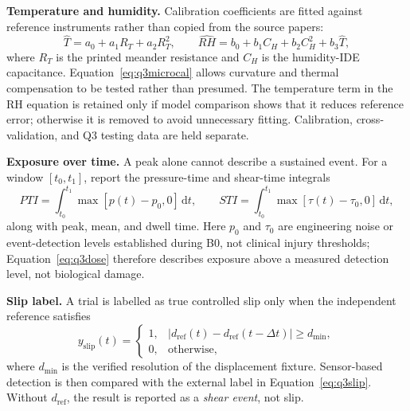 {\textbf{Temperature and humidity.} Calibration coefficients are fitted against
reference instruments rather than copied from the source papers:
\begin{equation}
 \widehat{T}=a_0+a_1R_T+a_2R_T^2,
 \qquad
 \widehat{RH}=b_0+b_1C_H+b_2C_H^2+b_3\widehat{T},
 \label{eq:q3microcal}
\end{equation}
where $R_T$ is the printed meander resistance and $C_H$ is the humidity-IDE
capacitance. Equation~\eqref{eq:q3microcal} allows curvature and thermal
compensation to be tested rather than presumed. The temperature term in the RH equation is retained only if
model comparison shows that it reduces reference error; otherwise it is
removed to avoid unnecessary fitting. Calibration, cross-validation, and Q3
testing data are held separate.\par

\textbf{Exposure over time.} A peak alone cannot describe a sustained event.
For a window $[t_0,t_1]$, report the pressure-time and shear-time integrals
\begin{equation}
 PTI=\int_{t_0}^{t_1}\max[p(t)-p_0,0]\,\mathrm{d}t,
 \qquad
 STI=\int_{t_0}^{t_1}\max[\tau(t)-\tau_0,0]\,\mathrm{d}t,
 \label{eq:q3dose}
\end{equation}
along with peak, mean, and dwell time. Here $p_0$ and $\tau_0$ are engineering
noise or event-detection levels established during B0, not clinical injury
thresholds; Equation~\eqref{eq:q3dose} therefore describes exposure above a
measured detection level, not biological damage.\par

\textbf{Slip label.} A trial is labelled as true controlled slip only when the
independent reference satisfies
\begin{equation}
 y_{\mathrm{slip}}(t)=
 \begin{cases}
 1,&|d_{\mathrm{ref}}(t)-d_{\mathrm{ref}}(t-\Delta t)|\ge d_{\min},\\
 0,&\text{otherwise},
 \end{cases}
 \label{eq:q3slip}
\end{equation}
where $d_{\min}$ is the verified resolution of the displacement fixture.
Sensor-based detection is then compared with the external label in
Equation~\eqref{eq:q3slip}. Without
$d_{\mathrm{ref}}$, the result is reported as a \emph{shear event}, not slip.\par}


